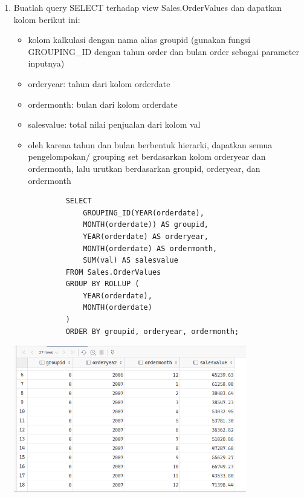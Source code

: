 \documentclass[12pt,titlepage]{article}
\begin{document}
\begin{enumerate}
{        Perbedaan antara sub klausa ROLLUP dan CUBE adalah ROLLUP hanya menghasilkan subtotal
        untuk kolom yang ditentukan sedangkan CUBE menghasilkan subtotal untuk semua kolom.
    }
    \pagebreak
    \item {
        Buatlah query SELECT terhadap view Sales.OrderValues dan dapatkan kolom berikut
        ini:
        \begin{itemize}
            \item kolom kalkulasi dengan nama alias groupid (gunakan fungsi GROUPING\_ID dengan tahun order dan bulan order sebagai parameter inputnya)
            \item orderyear: tahun dari kolom orderdate
            \item ordermonth: bulan dari kolom orderdate
            \item salesvalue: total nilai penjualan dari kolom val
            \item oleh karena tahun dan bulan berbentuk hierarki, dapatkan semua pengelompokan/ grouping set berdasarkan kolom orderyear dan ordermonth, lalu urutkan berdasarkan groupid, orderyear, dan ordermonth
        \end{itemize}

        \begin{verbatim}
            SELECT
                GROUPING_ID(YEAR(orderdate),
                MONTH(orderdate)) AS groupid,
                YEAR(orderdate) AS orderyear,
                MONTH(orderdate) AS ordermonth,
                SUM(val) AS salesvalue
            FROM Sales.OrderValues
            GROUP BY ROLLUP (
                YEAR(orderdate),
                MONTH(orderdate)
            )
            ORDER BY groupid, orderyear, ordermonth;
        \end{verbatim}

        \begin{center}
            \includegraphics[width=0.8\textwidth]{./images/15.png}
        \end{center}
    }
    \end{enumerate}
\end{document}

